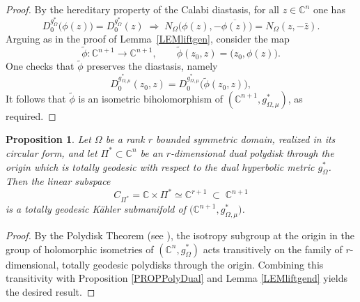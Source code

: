 \documentclass[reqno, 11pt]{amsart}
\newtheorem{prop}[theor]{Proposition}
\newcommand{\C}{\mathbb{C}}
\begin{document}
\begin{proof}
By the hereditary property of the Calabi diastasis, for all \(z\in\C^n\) one has
\[
D_0^{g_{\Omega}^*}\bigl(\phi(z)\bigr)
= D_0^{g_{\Omega}^*}(z)
\;\Longrightarrow\;
N_{\Omega}\bigl(\phi(z),-\overline{\phi(z)}\bigr)
= N_{\Omega}(z,-\bar z).
\]
Arguing as in the proof of Lemma~\ref{LEMliftgen}, consider the map
\[
\tilde\phi\colon \C^{n+1}\longrightarrow\C^{n+1},
\qquad
\tilde\phi(z_0,z) = \bigl(z_0,\phi(z)\bigr).
\]
One checks that \(\tilde\phi\) preserves the diastasis, namely
\[
D_0^{g^*_{{\Omega,\mu}}}(z_0,z)
= D_0^{g^*_{{\Omega,\mu}}}\bigl(\tilde\phi(z_0,z)\bigr),
\]
It follows that \(\tilde\phi\) is an isometric biholomorphism of \((\C^{n+1},g^*_{{\Omega,\mu}})\), as required.
\end{proof}






\begin{prop}\label{PROPPolydual2}
Let \(\Omega\) be a rank $r$ bounded symmetric domain, realized in its circular form, and let 
\(\Pi^*\subset\C^{n}\) be an \(r\)-dimensional dual polydisk through the origin which is totally geodesic with respect to the dual hyperbolic metric \(g_\Omega^*\).  Then the linear subspace
\[
C_{\Pi^*}
= \C\times\Pi^*\simeq \C^{r+1}
\;\subset\;\C^{n+1}
\]
is a totally geodesic Kähler submanifold of \(\bigl(\C^{n+1},g^*_{{\Omega,\mu}}\bigr)\).  
\end{prop}


\begin{proof}
By the Polydisk Theorem (see \cite{WolfBook1969FineStructureHSSpolydisc}), the isotropy subgroup at the origin in the group of holomorphic isometries of \((\C^n,g_{\Omega}^*)\) acts transitively on the family of \(r\)-dimensional, totally geodesic polydisks through the origin.  Combining this transitivity with Proposition \ref{PROPPolyDual} and Lemma \ref{LEMliftgend} yields the desired result.
\end{proof}
\end{document}
